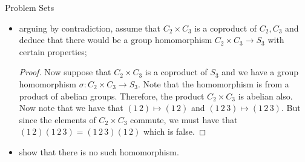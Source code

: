 \documentclass{report}
\begin{document}
\begin{exercises}{Problem Sets}
\begin{itemize}
            \item arguing by contradiction, assume that $C_{2} \times C_{3}$ is a coproduct of $C_{2}, C_{3}$ and deduce that there would be a group homomorphism $C_{2} \times C_{3} \rightarrow S_{3}$ with certain properties;
                \begin{proof}
                    Now suppose that $C_{2} \times C_{3}$ is a coproduct of $S_{3}$ and we have a group homomorphism $\sigma : C_{2} \times C_{3} \rightarrow S_{3}$. Note that the homomorphism is from a product of abelian groups. Therefore, the product $C_{2} \times C_{3}$ is abelian also. Now note that we have that $(1 \, 2) \mapsto (1 \, 2)$ and $(1 \, 2 \, 3) \mapsto (1 \, 2 \, 3)$. But since the elements of $C_{2} \times C_{3}$ commute, we must have that $(1 \, 2)(1 \, 2 \, 3) = (1 \, 2 \, 3)(1 \, 2)$ which is false.
                \end{proof}

            \item show that there is no such homomorphism.

        \end{itemize}


\end{exercises}
\end{document}
